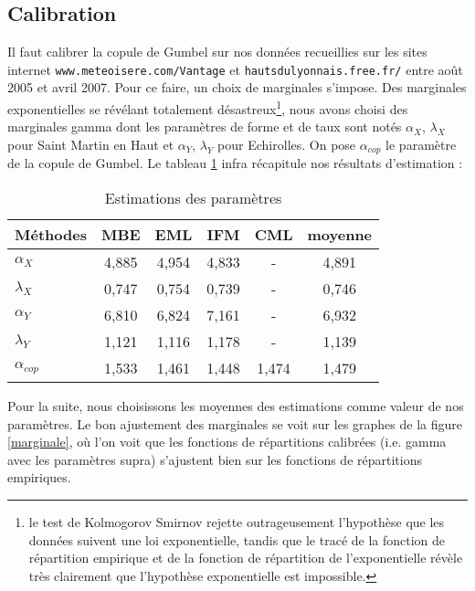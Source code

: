 \documentclass[11pt]{article}
\newcommand{\code}{\texttt}
\begin{document}
\subsection{Calibration}
Il faut calibrer la copule de Gumbel sur nos donn\'ees recueillies sur les sites internet \code{www.meteoisere.com/Vantage}  et
\code{hautsdulyonnais.free.fr/} entre ao\^ut 2005 et avril 2007. Pour ce faire, un choix de marginales s'impose. Des marginales
exponentielles se r\'ev\'elant totalement d\'esastreux\footnote{le test de Kolmogorov Smirnov rejette outrageusement
l'hypoth\`ese que les donn\'ees suivent une loi exponentielle, tandis que le trac\'e de la fonction de r\'epartition empirique
et de la fonction de r\'epartition de l'exponentielle r\'ev\`ele tr\`es clairement que l'hypoth\`ese exponentielle est 
impossible.}, nous avons choisi des marginales gamma dont les param\`etres de forme 
et de taux sont not\'es $\alpha_X$, $\lambda_X$ pour Saint Martin en Haut
et $\alpha_Y$, $\lambda_Y$ pour Echirolles. On pose $\alpha_{cop}$ le param\`etre de la copule de Gumbel. 
Le tableau \ref{estim} infra r\'ecapitule nos r\'esultats d'estimation :
\begin{table}[!htb]
\center
\begin{tabular}{lccccc}
\hline
M\'ethodes & MBE & EML & IFM & CML & moyenne\\
\hline
$\alpha_X$ & 4,885 & 4,954 & 4,833 & - & 4,891\\
\hline
$\lambda_X$ & 0,747 & 0,754 & 0,739 & - & 0,746\\
\hline
$\alpha_Y$ & 6,810 & 6,824 & 7,161 & - & 6,932\\
\hline
$\lambda_Y$ & 1,121 & 1,116 & 1,178 & - & 1,139\\
\hline
$\alpha_{cop}$ & 1,533 & 1,461 & 1,448 & 1,474 & 1,479\\
\hline
\end {tabular}
\caption{Estimations des param\`etres}
\label{estim}
\end{table}

Pour la suite, nous choisissons les moyennes des estimations comme valeur de nos param\`etres.
Le bon ajustement des marginales se voit sur les graphes de la figure \ref{marginale}, o\`u l'on voit
que les fonctions de r\'epartitions calibr\'ees (i.e. gamma avec les param\`etres supra) s'ajustent
bien sur les fonctions de r\'epartitions empiriques.
\end{document}
